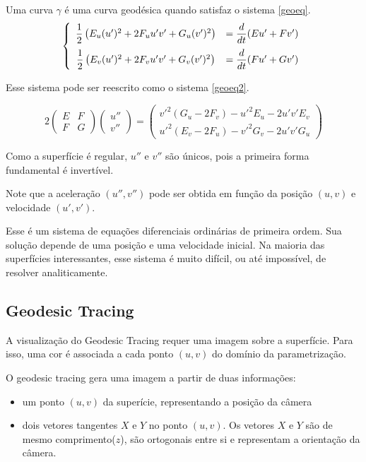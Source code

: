 Uma curva $\gamma$ é uma curva geodésica quando satisfaz o sistema \ref{geoeq}.
\begin{equation}
\label{geoeq}
    \left\{\begin{array}{cc}
        \dfrac{1}{2}\left(E_u(u')^2 + 2F_uu'v' + G_u(v')^2\right) & = \dfrac{d}{dt}(Eu' + Fv') \vspace{6pt}\\
        \dfrac{1}{2}\left(E_v(u')^2 + 2F_vu'v' + G_v(v')^2\right) & = \dfrac{d}{dt}(Fu' + Gv')
    \end{array}\right.
\end{equation}

Esse sistema pode ser reescrito como o sistema \ref{geoeq2}.

\begin{equation}
\label{geoeq2}
        2
        \begin{pmatrix}
            E & F \\
            F & G
        \end{pmatrix}
        \begin{pmatrix}
            u'' \\
            v''
        \end{pmatrix}
        =
        \begin{pmatrix}
            v'^2(G_u-2F_v)-u'^2E_u-2u'v'E_v \\
            u'^2(E_v-2F_u)-v'^2G_v-2u'v'G_u
        \end{pmatrix}
\end{equation}

Como a superfície é regular, $u''$ e $v''$ são únicos, pois a primeira forma
fundamental é invertível.

Note que a aceleração $(u'', v'')$ pode ser obtida em função da posição $(u,v)$
e velocidade $(u', v')$.

Esse é um sistema de equações diferenciais ordinárias de primeira ordem.
Sua solução depende de uma posição e uma velocidade inicial.
Na maioria das superfícies interessantes, esse sistema é muito difícil, ou até impossível,
de resolver analiticamente.

\subsection{Geodesic Tracing}
A visualização do Geodesic Tracing requer uma imagem sobre a superfície.
Para isso, uma cor é associada a cada ponto $(u,v)$ do domínio da parametrização.

O geodesic tracing gera uma imagem a partir de duas informações:
\begin{itemize}
    \item um ponto $(u,v)$ da superície, representando a posição da câmera
    \item dois vetores tangentes $X$ e $Y$ no ponto $(u,v)$.
    Os vetores $X$ e $Y$ são de mesmo comprimento($z$), são ortogonais entre si e
    representam a orientação da câmera.
\end{itemize}

